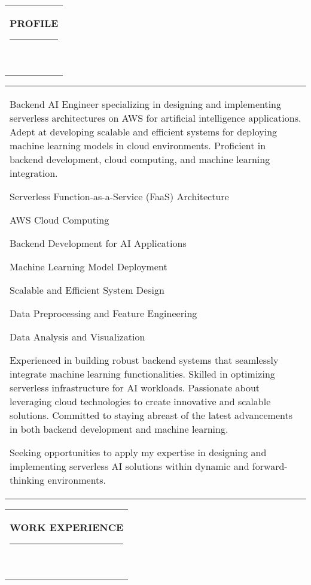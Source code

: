 \documentclass[10pt,A4]{article}
\newcommand{\mpwidth}{\linewidth-\fboxsep-\fboxsep}
\newcommand{\cvlist}[1] {
	\begin{itemize}{#1}\end{itemize}
}
\newcommand{\cvtext}[1] {
	\begin{tabular*}{1\mpwidth}{p{0.98\mpwidth}}
		\parbox{1\mpwidth}{#1}
	\end{tabular*}
}
\newcommand{\cvsection}[1] {
	\vspace{14pt}
	\cvtext{
		\textbf{\LARGE{\textcolor{darkcol}{\uppercase{#1}}}}\\[-4pt]
		\textcolor{maincol}{ \rule{0.1\textwidth}{2pt} } \\
	}
}
\begin{document}
\begin{paracol}{2}
\begin{rightcolumn}
\vfill\null
\cvsection{PROFILE}

\cvtext{
Backend AI Engineer specializing in designing and implementing serverless architectures on AWS for artificial intelligence applications. Adept at developing scalable and efficient systems for deploying machine learning models in cloud environments. Proficient in backend development, cloud computing, and machine learning integration.

\cvlist{
\item Serverless Function-as-a-Service (FaaS) Architecture
\item AWS Cloud Computing
\item Backend Development for AI Applications
\item Machine Learning Model Deployment
\item Scalable and Efficient System Design
\item Data Preprocessing and Feature Engineering
\item Data Analysis and Visualization
}

Experienced in building robust backend systems that seamlessly integrate machine learning functionalities. Skilled in optimizing serverless infrastructure for AI workloads. Passionate about leveraging cloud technologies to create innovative and scalable solutions. Committed to staying abreast of the latest advancements in both backend development and machine learning.

Seeking opportunities to apply my expertise in designing and implementing serverless AI solutions within dynamic and forward-thinking environments.
}



\cvsection{WORK EXPERIENCE}


\end{rightcolumn}
\end{paracol}
\end{document}
